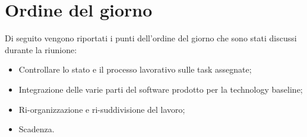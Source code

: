 \clearpage
\section{Ordine del giorno}
Di seguito vengono riportati i punti dell’ordine del giorno che sono stati discussi durante la riunione:
\begin{itemize}
	\item Controllare lo stato e il processo lavorativo sulle task assegnate;
	\item Integrazione delle varie parti del software prodotto per la technology baseline;
	\item Ri-organizzazione e ri-suddivisione del lavoro;
	\item Scadenza.
\end{itemize}